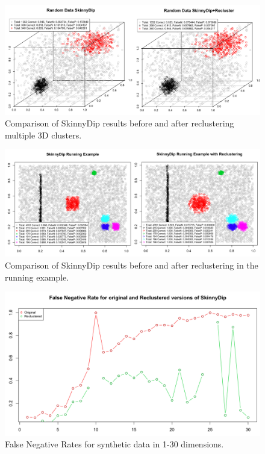 \documentclass{sig-alternate-05-2015}
\begin{document}
\begin{figure}[t]
\centering
\includegraphics[width=\textwidth]{images/multicompare}
\caption{Comparison of SkinnyDip results before and after reclustering multiple 3D clusters.}
\label{fig:multicompare}
\end{figure}

\begin{figure}[t]
\centering
\includegraphics[width=\textwidth]{images/Runningcompare}
\caption{Comparison of SkinnyDip results before and after reclustering in the running example.}
\label{fig:runningcompare}
\end{figure}

\begin{figure}[t]
\centering
\includegraphics[width=\textwidth]{images/falsenegmd}
\caption{False Negative Rates for synthetic data in 1-30 dimensions.}
\label{fig:falsenegmd}
\end{figure}
\end{document}
